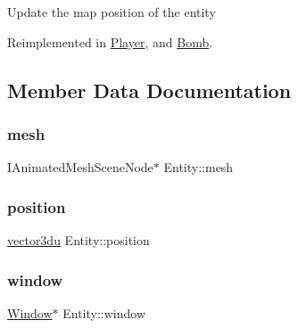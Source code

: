 Update the map position of the entity 

Reimplemented in \mbox{\hyperlink{class_player_a6912bb6e48efb5845d59f0f4582827ef}{Player}}, and \mbox{\hyperlink{class_bomb_a15851182c209713a5946f977a7fb24b8}{Bomb}}.



\subsection{Member Data Documentation}
\mbox{\label{class_entity_adb691a1a6673fe33622280d1b51dfd2f}} 
\subsubsection{\texorpdfstring{mesh}{mesh}}
{\footnotesize\ttfamily I\+Animated\+Mesh\+Scene\+Node$\ast$ Entity\+::mesh\hspace{0.3cm}{\ttfamily [protected]}}

\mbox{\label{class_entity_a17bbbb9c9f1a69803172f6ca830cf2f2}} 
\subsubsection{\texorpdfstring{position}{position}}
{\footnotesize\ttfamily \mbox{\hyperlink{_utility_8hpp_ac675fa2b6c79d0be47ae76e5d0ce38a8}{vector3du}} Entity\+::position\hspace{0.3cm}{\ttfamily [protected]}}

\mbox{\label{class_entity_a1f2791b6a53a16e200a687f843cee7fb}} 
\subsubsection{\texorpdfstring{window}{window}}
{\footnotesize\ttfamily \mbox{\hyperlink{class_window}{Window}}$\ast$ Entity\+::window\hspace{0.3cm}{\ttfamily [protected]}}

\mbox{\label{class_entity_a038b06c38fe6bb385f37c05a5647c0dc}} 
